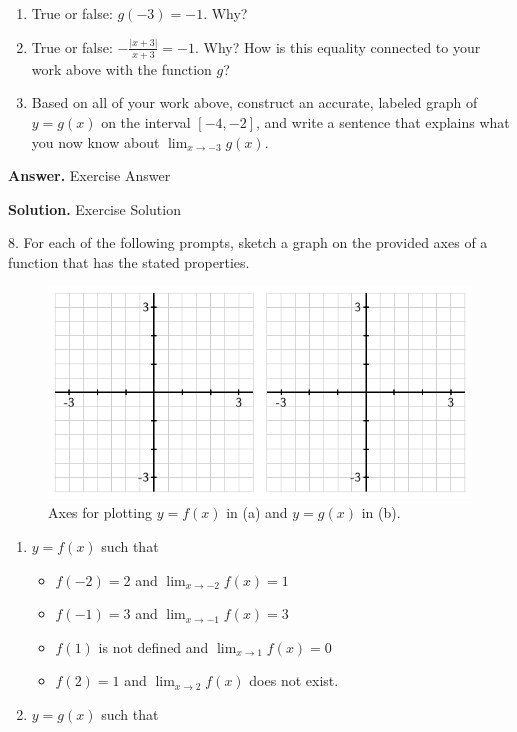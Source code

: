 \documentclass[10pt,]{book}
\theoremstyle{plain}
\theoremstyle{definition}
\theoremstyle{definition}
\theoremstyle{definition}
\theoremstyle{definition}
\theoremstyle{definition}
\numberwithin{equation}{section}
\begin{document}
\begin{exerciselist}
\begin{enumerate}[label=\alph*]
\item\hypertarget{li-97}{}True or false: \(g(-3) = -1\).  Why?%
\item\hypertarget{li-98}{}True or false: \(-\frac{|x+3|}{x+3} = -1.\)  Why?  How is this equality connected to your work above with the function \(g\)?%
\item\hypertarget{li-99}{}Based on all of your work above, construct an accurate, labeled graph of \(y = g(x)\) on the interval \([-4,-2]\), and write a sentence that explains what you now know about \(\lim_{x \to -3} g(x)\).%
\end{enumerate}
\par\smallskip
\par\smallskip
\noindent\textbf{Answer.}\hypertarget{answer-11}{}\quad
Exercise Answer%
\par\smallskip
\noindent\textbf{Solution.}\hypertarget{solution-13}{}\quad
Exercise Solution%
\item[8.]\hypertarget{ez-1-2-Two-Graphs}{}For each of the following prompts, sketch a graph on the provided axes of a function that has the stated properties.
\leavevmode%
\begin{figure}
\centering
\includegraphics[width=0.5\linewidth]{images/1_2_Ez3}
\caption{Axes for plotting \(y = f(x)\) in (a) and \(y = g(x)\) in (b).\label{F-1-2-Ez3}}
\end{figure}
\leavevmode%
\begin{enumerate}[label=\alph*]
\item\hypertarget{li-100}{}\(y = f(x)\) such that 
\begin{itemize}[label=\textbullet]
\item{}\(f(-2) = 2\) and \(\lim_{x \to -2} f(x) = 1\)%
\item{}\(f(-1) = 3\) and \(\lim_{x \to -1} f(x) = 3\)%
\item{}\(f(1)\) is not defined and \(\lim_{x \to 1} f(x) = 0\)%
\item{}\(f(2) = 1\) and \(\lim_{x \to 2} f(x)\) does not exist.%
\end{itemize}
%
\item\hypertarget{li-105}{}\(y = g(x)\) such that

\end{enumerate}
\end{exerciselist}
\end{document}
